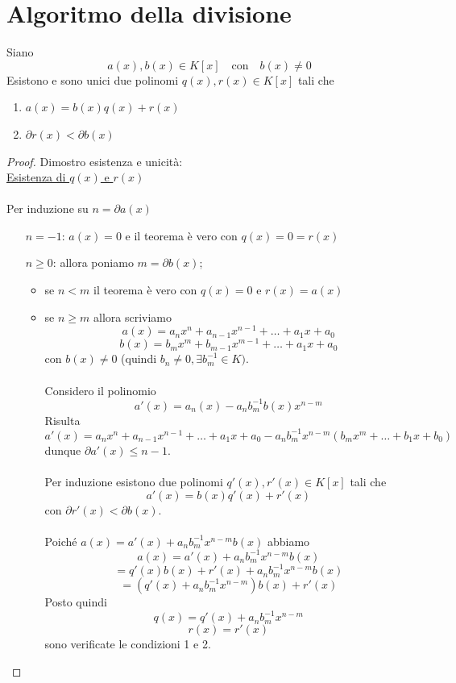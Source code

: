 \documentclass[a4paper,12pt, oneside]{book}
\begin{document}
\section{Algoritmo della divisione}
\begin{teorema}
	Siano $$a(x), b(x) \in K[x] \quad \mbox{con} \quad b(x) \not = 0$$
	Esistono e sono unici due polinomi $q(x), r(x) \in K[x]$ tali che
	\begin{enumerate}
		\item $a(x) = b(x)q(x)+r(x)$
		\item $\partial r(x) < \partial b(x)$
	\end{enumerate}

	\begin{proof} Dimostro esistenza e unicità:\\

		\underline{Esistenza di $q(x)$ e $r(x)$}\\\\
		Per induzione su $n = \partial a(x)$
		\begin{itemize}
			\item[$n = -1$:] $a(x)=0$ e il teorema è vero con $q(x) = 0 = r(x)$
			\item[$n \geq 0$:] allora poniamo $m = \partial b(x)$;
			      \begin{itemize}
				      \item se $n < m$ il teorema è vero con $q(x)=0$ e $r(x)=a(x)$
				      \item se $n \geq m$ allora scriviamo
				            $$a(x) = a_{n}x^{n} + a_{n-1}x^{n-1} + \dots + a_{1}x + a_{0}$$
				            $$b(x) = b_{m}x^{m} + b_{m-1}x^{m-1} + \dots + a_{1}x + a_{0}$$
				            con $b(x) \not = 0$ (quindi $b_n \not = 0, \exists b_m^{-1} \in K)$.\\\\
				            Considero il polinomio
				            $$a'(x) = a_n(x) - a_nb_m^{-1} b(x) x^{n-m}$$
				            Risulta
				            $$a'(x) = a_nx^n + a_{n-1}x^{n-1}+ \dots + a_1x+a_0 - a_nb_m^{-1}x^{n-m}(b_mx^m+\dots+b_1x+b_0)$$
				            dunque $\partial a'(x) \leq n-1$.\\\\
				            Per induzione esistono due polinomi $q'(x), r'(x) \in K[x]$ tali che
				            $$a'(x) = b(x)q'(x) + r'(x)$$
				            con $\partial r'(x) < \partial b(x)$.\\\\
				            Poiché $a(x) = a'(x) + a_nb_m^{-1}x^{n-m}b(x)$ abbiamo
				            $$a(x) = a'(x) + a_nb_m^{-1}x^{n-m}b(x)$$
				            $$= q'(x)b(x)+r'(x) + a_nb_m^{-1}x^{n-m}b(x)$$
				            $$= (q'(x) + a_nb_m^{-1}x^{n-m})b(x) +r'(x)$$
				            Posto quindi
				            $$q(x) = q'(x) + a_nb_m^{-1}x^{n-m} $$
				            $$r(x) = r'(x)$$
				            sono verificate le condizioni 1 e 2.\\
			      \end{itemize}
		\end{itemize}


\end{proof}
\end{teorema}
\end{document}
